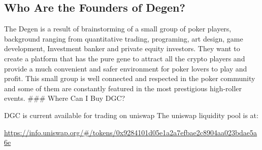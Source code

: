 \documentclass[
]{book}
\begin{document}
\hypertarget{who-are-the-founders-of-degen}{%
\subsection{Who Are the Founders of Degen?}\label{who-are-the-founders-of-degen}}

The Degen is a result of brainstorming of a small group of poker players, background ranging from quantitative trading, programing, art design, game development, Investment banker and private equity investors. They want to create a platform that has the pure gene to attract all the crypto players and provide a much convenient and safer environment for poker lovers to play and profit.
This small group is well connected and respected in the poker community and some of them are constantly featured in the most prestigious high-roller events.
\#\#\# Where Can I Buy DGC?

DGC is current available for trading on uniswap
The uniswap liquidity pool is at:

\url{https://info.uniswap.org/\#/tokens/0x9284101d05e1a2a7efbae2c8904aa023bdae5a6e}

  
\end{document}
